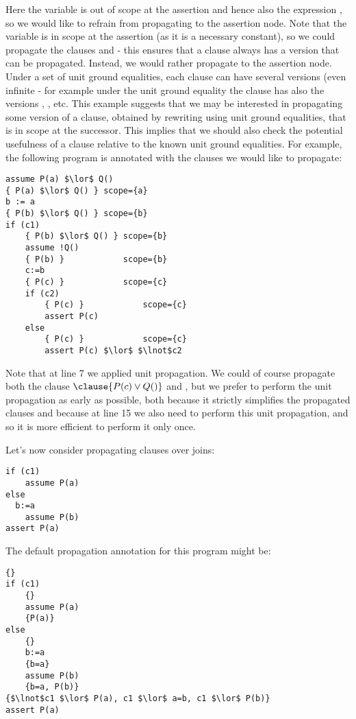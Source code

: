 Here the variable  is out of scope at the assertion and hence also the expression , 
so we would like to refrain from propagating  to the assertion node.
Note that the variable  is in scope at the assertion (as it is a necessary constant), so we could propagate the clauses  and  - this ensures that a clause always has a version that can be propagated.
Instead, we would rather propagate  to the assertion node.
Under a set of unit ground equalities, each clause can have several versions (even infinite - for example under the unit ground equality  the clause  has also the versions , , etc.
This example suggests that we may be interested in propagating some version of a clause, obtained by rewriting using unit ground equalities, that is in scope at the successor. This implies that we should also check the potential usefulness of a clause relative to the known unit ground equalities. For example, the following program is annotated with the clauses we would like to propagate:

\begin{lstlisting}[caption=Hoare proof scoping,label=snippet3.5.2]
assume P(a) $\lor$ Q()
{ P(a) $\lor$ Q() } scope={a}
b := a
{ P(b) $\lor$ Q() } scope={b}
if (c1)
	{ P(b) $\lor$ Q() } scope={b}
	assume !Q()
	{ P(b) }            scope={b}
	c:=b
	{ P(c) }            scope={c}
	if (c2)
		{ P(c) }            scope={c}
		assert P(c)
	else
		{ P(c) }            scope={c}
		assert P(c) $\lor$ $\lnot$c2
\end{lstlisting}

Note that at line 7 we applied unit propagation.
We could of course propagate both the clause $\clause{P(c) \lor Q()}$ and , but we prefer to perform the unit propagation as early as possible, both because it strictly simplifies the propagated clauses and because at line 15 we also need to perform this unit propagation, and so it is more efficient to perform it only once.

Let's now consider propagating clauses over joins:
\begin{lstlisting}[caption=scoping join,label=snippet3.5.3]
if (c1)
	assume P(a)
else
  b:=a
	assume P(b)
assert P(a)
\end{lstlisting}

The default propagation annotation for this program might be:
\begin{lstlisting}[caption=Hoare scoping join ,label=snippet3.5.4]
{}
if (c1)
	{}
	assume P(a)
	{P(a)}
else
	{}
	b:=a
	{b=a}
	assume P(b)
	{b=a, P(b)}
{$\lnot$c1 $\lor$ P(a), c1 $\lor$ a=b, c1 $\lor$ P(b)}
assert P(a)
\end{lstlisting}


